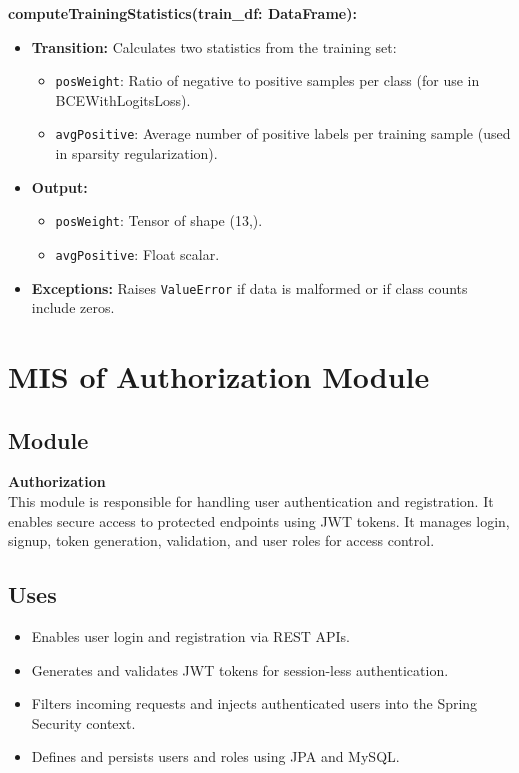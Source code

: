 \documentclass[12pt, titlepage]{article}
\begin{document}
\textbf{computeTrainingStatistics(train\_df: DataFrame):}
\begin{itemize}
    \item \textbf{Transition:} Calculates two statistics from the training set:
    \begin{itemize}
        \item \texttt{posWeight}: Ratio of negative to positive samples per class (for use in BCEWithLogitsLoss).
        \item \texttt{avgPositive}: Average number of positive labels per training sample (used in sparsity regularization).
    \end{itemize}
    \vspace{0.1cm}
    \item \textbf{Output:} 
    \begin{itemize}
        \item \texttt{posWeight}: Tensor of shape (13,).
        \item \texttt{avgPositive}: Float scalar.
    \end{itemize}
    \vspace{0.1cm}
    \item \textbf{Exceptions:} Raises \texttt{ValueError} if data is malformed or if class counts include zeros.
\end{itemize}
\newpage



\section{MIS of Authorization Module}

\subsection{Module}
\textbf{Authorization} \\
This module is responsible for handling user authentication and registration. It enables secure access to protected endpoints using JWT tokens. It manages login, signup, token generation, validation, and user roles for access control.

\subsection{Uses}
\begin{itemize}
    \item Enables user login and registration via REST APIs.
    \item Generates and validates JWT tokens for session-less authentication.
    \item Filters incoming requests and injects authenticated users into the Spring Security context.
    \item Defines and persists users and roles using JPA and MySQL.
\end{itemize}
\end{document}
